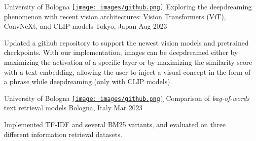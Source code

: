 \begin{cventries}


\cventry
  {University of Bologna} %
  {\href{https://github.com/Dundalia/pytorch-deepdream}{\texttt{[image: images/github.png]}} 
  Exploring the deepdreaming phenomenon with recent vision architectures: Vision Transformers (ViT), ConvNeXt, and CLIP models} 
  {Tokyo, Japan} %
  {Aug 2023} %
  {
    \begin{cvitems} %
      \item {Updated a github repository to support the newest vision models and pretrained checkpoints. With our implementation, images can be deepdreamed either by maximizing the activation of a specific layer or by maximizing the similarity score with a text embedding, allowing the user to inject a visual concept in the form of a phrase while deepdreaming (only with CLIP models).}
    \end{cvitems}
  }

  \cventry
    {University of Bologna} %
    {\href{https://github.com/Dundalia/Sparse_retrieval_models}{\texttt{[image: images/github.png]}} Comparison of \textit{bag-of-words} text retrieval models} %
    {Bologna, Italy} %
    {Mar 2023} %
    {
      \begin{cvitems} %
        \item {Implemented TF-IDF and several BM25 variants, and evaluated  on three different information retrieval datasets.}
      \end{cvitems}
    }



\end{cventries}
